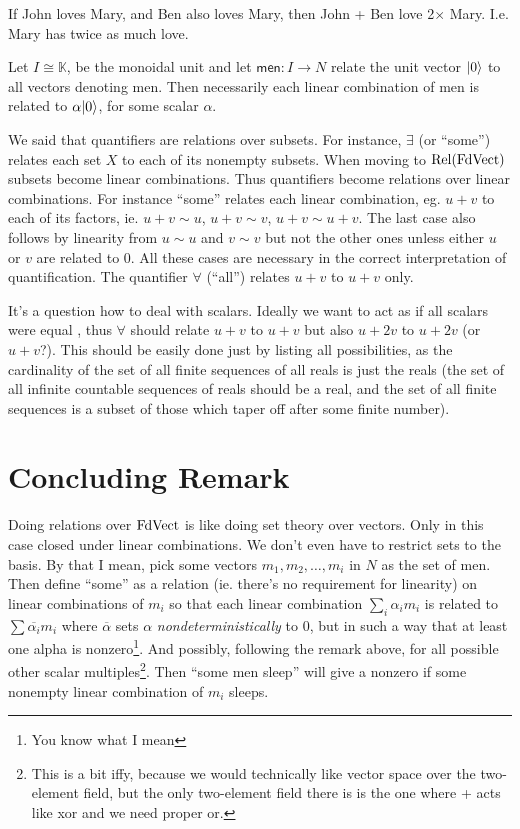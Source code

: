 If John loves Mary, and Ben also loves Mary, then John + Ben love
2$\times$ Mary. I.e. Mary has twice as much love. 

Let $I \cong \mathbb{K}$, be the monoidal unit and let $\mathsf{men} : I \to
N$ relate the unit vector $|{0}\rangle$ to all vectors denoting men. Then
necessarily each linear combination of men is related to
$\alpha|{0}\rangle$, for some scalar $\alpha$. 


We said that quantifiers are relations over subsets. For instance,
$\exists$ (or ``some'') relates each set $X$ to each of its nonempty
subsets. When moving to $\mathrm{Rel}(\mathrm{FdVect})$ subsets become linear
combinations. Thus quantifiers become relations over linear
combinations. For instance ``some'' relates each linear combination,
eg. $u + v$ to each of its factors, ie. $u+v \sim u$, $u+v \sim v$, $u
+ v \sim u + v$. The last case also follows by linearity from $u \sim
u$ and $v \sim v$ but not the other ones unless either $u$ or $v$ are
related to $0$.  All these cases are necessary in the correct
interpretation of quantification. The quantifier $\forall$ (``all'')
relates $u + v$ to $u+v$ only. 

It's a question how to deal with scalars. Ideally we want to act as if
all scalars were equal , thus $\forall$ should relate $u+v$ to $u+v$
but also $u+2v$ to $u+2v$ (or $u+v$?). This should be easily done just
by listing all possibilities, as
the cardinality of the set of all finite sequences of all reals is
just the reals (the set of all infinite countable sequences of
reals should be a real, and the set of all finite sequences is a subset of
those which taper off after some finite number). 

\section{Concluding Remark}
Doing relations over $\mathrm{FdVect}$ is like doing set theory over
vectors. Only in this case closed under linear combinations. We don't
even have to restrict sets to the basis. By that I mean, pick some
vectors $m_1, m_2, \ldots, m_i$ in $N$ as the set of men. Then define
``some'' as a relation (ie. there's no requirement for linearity) on
linear combinations of $m_i$ so that each linear combination $\sum_i
\alpha_i m_i$ is related to $\sum \overline{\alpha_i} m_i$ where
$\overline{\alpha}$ sets $\alpha$ \emph{nondeterministically} to $0$, but
in such a way that at least one alpha is nonzero\footnote{You know
  what I mean}. And possibly, following the remark above, for all
possible other scalar multiples\footnote{This is a bit iffy, because
  we would technically like vector space over the two-element field,
  but the only two-element field there is is the one where + acts like
  \textsf{xor} and we need proper \textsf{or}.}. Then ``some men
sleep'' will give a nonzero if some nonempty linear combination of
$m_i$ sleeps. 


